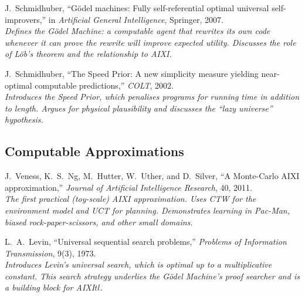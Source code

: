\documentclass[11pt,a4paper]{article}
\theoremstyle{definition}
\theoremstyle{remark}
\begin{document}
\begin{description}[style=nextline, leftmargin=1.5em]

\item[\textmd{[Schmidhuber, 2007]}]
J.~Schmidhuber,
``G\"odel machines: Fully self-referential optimal universal self-improvers,''
in \emph{Artificial General Intelligence}, Springer, 2007.\\
\textit{Defines the G\"odel Machine: a computable agent that rewrites its
own code whenever it can prove the rewrite will improve expected utility.
Discusses the role of L\"ob's theorem and the relationship to AIXI.}

\item[\textmd{[Schmidhuber, 2002]}]
J.~Schmidhuber,
``The Speed Prior: A new simplicity measure yielding near-optimal
computable predictions,'' \emph{COLT}, 2002.\\
\textit{Introduces the Speed Prior, which penalises programs for running
time in addition to length.  Argues for physical plausibility and discusses
the ``lazy universe'' hypothesis.}

\end{description}

\subsection*{Computable Approximations}

\begin{description}[style=nextline, leftmargin=1.5em]

\item[\textmd{[Veness et al., 2011]}]
J.~Veness, K.~S.~Ng, M.~Hutter, W.~Uther, and D.~Silver,
``A Monte-Carlo AIXI approximation,''
\emph{Journal of Artificial Intelligence Research}, 40, 2011.\\
\textit{The first practical (toy-scale) AIXI approximation.  Uses CTW
for the environment model and UCT for planning.  Demonstrates learning
in Pac-Man, biased rock-paper-scissors, and other small domains.}

\item[\textmd{[Levin, 1973]}]
L.~A.\ Levin,
``Universal sequential search problems,''
\emph{Problems of Information Transmission}, 9(3), 1973.\\
\textit{Introduces Levin's universal search, which is optimal up to a
multiplicative constant.  This search strategy underlies the G\"odel
Machine's proof searcher and is a building block for AIXI$tl$.}

\end{description}
\end{document}

